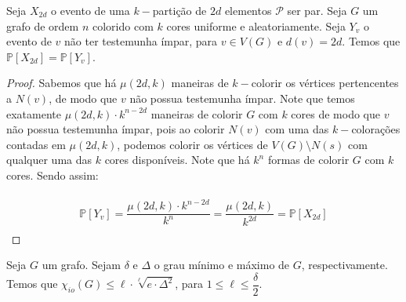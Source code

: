 \documentclass[12pt]{article}
\begin{document}
 \begin{lema}  
 	\label{lema10} 
 	Seja $X_{2d}$ o evento de uma $k-$partição de $2d$ elementos $\mathcal{P}$ ser par. Seja $G$ um grafo de ordem $n$ colorido com $k$ cores uniforme e aleatoriamente. Seja $Y_{v}$ o evento de $v$ não ter testemunha ímpar, para $v \in V(G)$ e $d(v) = 2d$. Temos que $\mathds{P}[X_{2d}] = \mathds{P}[Y_v]$.
 \end{lema}
 
 \begin{proof}
 	Sabemos que há $\mu(2d, k)$ maneiras de $k-$colorir os vértices pertencentes a $N(v)$, de modo que $v$ não possua testemunha ímpar. Note que temos exatamente $\mu(2d, k) \cdot k^{n - 2d}$ maneiras de colorir $G$ com $k$ cores de modo que $v$ não possua testemunha ímpar, pois ao colorir $N(v)$ com uma das $k-$colorações contadas em $\mu(2d, k)$, podemos colorir os vértices de $V(G)\setminus N(s)$ com qualquer uma das $k$ cores disponíveis. Note que há $k^n$ formas de colorir $G$ com $k$ cores. Sendo assim: 
 	
 	\begin{align}
 		\begin{split}
 			 \mathds{P}[Y_v] = \dfrac{\mu(2d, k) \cdot k^{n - 2d}}{k^n} = \dfrac{\mu(2d, k)}{k^{2d}} = \mathds{P}[X_{2d}]
 		\end{split} 
 	\end{align}
 	
 \end{proof}
 
 \begin{lema}
 	\label{lema11} Seja $G$ um grafo. Sejam $\delta$ e $\Delta$ o grau mínimo e máximo de $G$, respectivamente. Temos que $\chi_{io}(G) \leq \ell \cdot \sqrt[\ell]{e \cdot \Delta^2}$, para $1 \leq \ell \leq \dfrac{\delta}{2}$.
 \end{lema}
  
\end{document}
